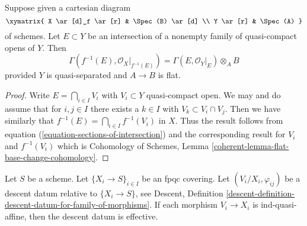 \begin{lemma}
\label{lemma-affine-base-change}
Suppose given a cartesian diagram
$$
\xymatrix{
X \ar[d]_f \ar[r] & \Spec(B) \ar[d] \\
Y \ar[r] & \Spec(A)
}
$$
of schemes. Let $E \subset Y$ be an intersection of a nonempty family
of quasi-compact opens of $Y$. Then
$$
\Gamma(f^{-1}(E), \mathcal{O}_X|_{f^{-1}(E)}) =
\Gamma(E, \mathcal{O}_Y|_E) \otimes_A B
$$
provided $Y$ is quasi-separated and $A \to B$ is flat.
\end{lemma}

\begin{proof}
Write $E = \bigcap_{i \in I} V_i$ with $V_i \subset Y$ quasi-compact open.
We may and do assume that for $i, j \in I$ there exists a $k \in I$ with
$V_k \subset V_i \cap V_j$. Then we have similarly that
$f^{-1}(E) = \bigcap_{i \in I} f^{-1}(V_i)$ in $X$.
Thus the result follows from equation (\ref{equation-sections-of-intersection})
and the corresponding result for $V_i$ and $f^{-1}(V_i)$ which is
Cohomology of Schemes, Lemma \ref{coherent-lemma-flat-base-change-cohomology}.
\end{proof}

\begin{lemma}[Gabber]
\label{lemma-ind-quasi-affine}
Let $S$ be a scheme. Let $\{X_i \to S\}_{i\in I}$ be an fpqc covering.
Let $(V_i/X_i, \varphi_{ij})$ be a descent datum relative to
$\{X_i \to S\}$, see Descent, Definition
\ref{descent-definition-descent-datum-for-family-of-morphisms}. 
If each morphism $V_i \to X_i$ is ind-quasi-affine, then the descent datum
is effective.
\end{lemma}

